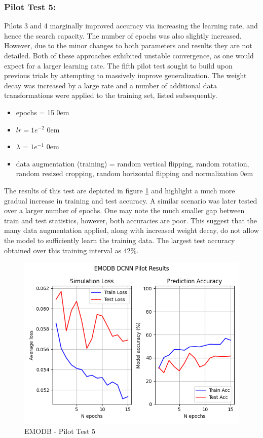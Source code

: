 \subsubsection{Pilot Test 5:}
Pilots 3 and 4 marginally improved accuracy via increasing the learning rate, and hence the search capacity. The number of epochs was also slightly increased. However, due to the minor changes to both parameters and results they are not detailed. Both of these approaches exhibited unstable convergence, as one would expect for a larger learning rate. The fifth pilot test sought to build upon previous trials by attempting to massively improve generalization. The weight decay was increased by a large rate and a number of additional data transformations were applied to the training set, listed subsequently.
\begin{itemize}
    \item epochs = 15
    \itemsep0em
    \item $lr = 1e^{-2}$
    \itemsep0em
    \item $\lambda$ = $1e^{-1}$
    \itemsep0em
    \item data augmentation (training) = random vertical flipping, random rotation, random resized cropping, random horizontal flipping and normalization
    \itemsep0em
\end{itemize}
The results of this test are depicted in figure \ref{Pilot5_fig} and highlight a much more gradual increase in training and test accuracy. A similar scenario was later tested over a larger number of epochs. One may note the much smaller gap between train and test statistics, however, both accuracies are poor. This suggest that the many data augmentation applied, along with increased weight decay, do not allow the model to sufficiently learn the training data. The largest test accuracy obtained over this training interval as $42\%$.
\begin{figure}[ht]
        \centering
        \includegraphics[scale = 0.6]{images_results/EMODB_PilotTests/EMODB_PilotResults_30-05__16-57.png}
        \caption{EMODB - Pilot Test 5}
        \label{Pilot5_fig}
\end{figure}

